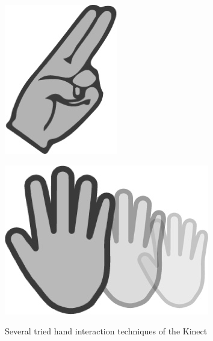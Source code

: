 \begin{figure}[htb]
\begin{minipage}[t]{0.1\linewidth}
		\label{fig:5_3_fist}
	\end{minipage}
	\hfill
	\begin{minipage}[t]{0.12\linewidth}
		\centering
		\includegraphics[width=1\linewidth]{Pictures/5_3_point}
		\label{fig:5_3_point}
	\end{minipage}
	\hfill
	\begin{minipage}[t]{0.22\linewidth}
		\centering
		\includegraphics[width=1\linewidth]{Pictures/5_3_push2}
		\label{fig:5_3_push}
	\end{minipage}
	\caption{Several tried hand interaction techniques of the Kinect}
	\label{fig:5_3_handInteraction}
\end{figure}

